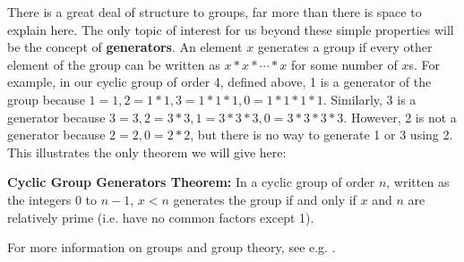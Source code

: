 \documentclass[man,10pt]{apa6}
\begin{document}
There is a great deal of structure to groups, far more than there is space to explain here. The only topic of interest for us beyond these simple properties will be the concept of \textbf{generators}. An element $x$ generates a group if every other element of the group can be written as $x*x*\cdots*x$ for some number of $x$s. For example, in our cyclic group of order 4, defined above, 1 is a generator of the group because $1 = 1, 2 = 1 * 1, 3 = 1 * 1 * 1, 0 = 1 * 1 * 1 * 1$. Similarly, 3 is a generator because $3 = 3, 2 = 3 * 3, 1 = 3 * 3 * 3, 0 = 3 * 3 * 3 * 3$. However, 2 is not a generator because $2 = 2, 0 = 2 * 2$, but there is no way to generate 1 or 3 using 2. This illustrates the only theorem we will give here: \par
\textbf{Cyclic Group Generators Theorem:} In a cyclic group of order $n$, written as the integers $0$ to $n-1$, $x < n$ generates the group if and only if $x$ and $n$ are relatively prime (i.e. have no common factors except 1). \par 
For more information on groups and group theory, see e.g. \cite{Lang2002}.
\end{document}
